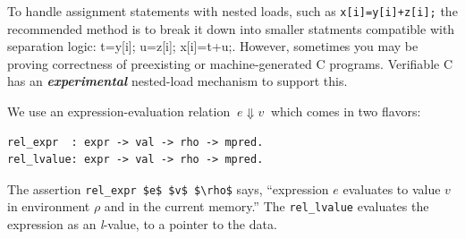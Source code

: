 \documentclass[12pt,fleqn,openany,oneside,showtrims]{memoir}
\begin{document}
To handle assignment statements with nested loads, such as
\lstinline{x[i]=y[i]+z[i];}
the recommended method is to break it down into smaller statments
compatible with separation logic: {t=y[i]; u=z[i]; x[i]=t+u;}.
However, sometimes you may be proving correctness of preexisting
or machine-generated C programs.  Verifiable C
has an \textbf{\textit{experimental}} nested-load mechanism to
support this.

We use an expression-evaluation relation $~e\Downarrow v~$
which comes in two flavors:
\begin{lstlisting}
rel_expr  : expr -> val -> rho -> mpred.
rel_lvalue: expr -> val -> rho -> mpred.
\end{lstlisting}
The assertion \lstinline{rel_expr $e$ $v$ $\rho$} says,
``expression $e$ evaluates to value $v$ in environment $\rho$
and in the current memory.''  The \lstinline{rel_lvalue} evaluates
the expression as an \emph{l}-value, to a pointer to the data.
\end{document}
